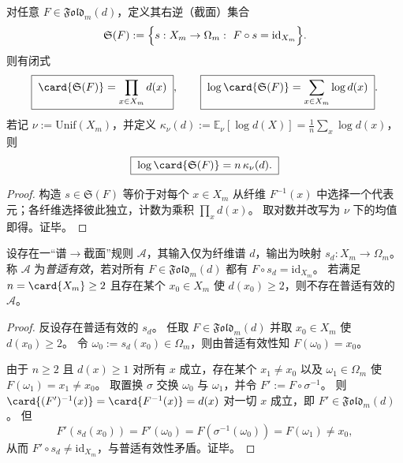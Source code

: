 \begin{theorem}\label{thm:pom-microcanonical-section-count}
对任意 \(F\in\mathfrak{Fold}_m(d)\)，定义其右逆（截面）集合
\[
\mathfrak{S}(F):=\Bigl\{s:X_m\to \Omega_m:\ F\circ s=\mathrm{id}_{X_m}\Bigr\}.
\]
则有闭式
\[
\boxed{\;
\card{\mathfrak{S}(F)}=\prod_{x\in X_m} d(x)\; } ,
\qquad
\boxed{\;
\log\card{\mathfrak{S}(F)}=\sum_{x\in X_m}\log d(x)\; } .
\]
若记 \(\nu:=\mathrm{Unif}(X_m)\)，并定义
\(
\kappa_\nu(d):=\mathbb{E}_{\nu}[\log d(X)]=\frac{1}{n}\sum_x\log d(x)
\)，则
\[
\boxed{\;
\log\card{\mathfrak{S}(F)}=n\,\kappa_\nu(d).\;}
\]
\end{theorem}
\begin{proof}
构造 \(s\in\mathfrak{S}(F)\) 等价于对每个 \(x\in X_m\) 从纤维 \(F^{-1}(x)\) 中选择一个代表元；各纤维选择彼此独立，计数为乘积 \(\prod_x d(x)\)。
取对数并改写为 \(\nu\) 下的均值即得。证毕。
\end{proof}

\begin{theorem}\label{thm:pom-spectrum-cannot-induce-universal-section}
设存在一“谱\(\to\)截面”规则 \(\mathcal{A}\)，其输入仅为纤维谱 \(d\)，输出为映射 \(s_d:X_m\to\Omega_m\)。
称 \(\mathcal{A}\) 为\emph{普适有效}，若对所有 \(F\in\mathfrak{Fold}_m(d)\) 都有 \(F\circ s_d=\mathrm{id}_{X_m}\)。
若满足 \(n=\card{X_m}\ge 2\) 且存在某个 \(x_0\in X_m\) 使 \(d(x_0)\ge 2\)，则不存在普适有效的 \(\mathcal{A}\)。
\end{theorem}
\begin{proof}
反设存在普适有效的 \(s_d\)。
任取 \(F\in\mathfrak{Fold}_m(d)\) 并取 \(x_0\in X_m\) 使 \(d(x_0)\ge 2\)。
令 \(\omega_0:=s_d(x_0)\in\Omega_m\)，则由普适有效性知 \(F(\omega_0)=x_0\)。
\par
由于 \(n\ge 2\) 且 \(d(x)\ge 1\) 对所有 \(x\) 成立，存在某个 \(x_1\neq x_0\) 以及 \(\omega_1\in\Omega_m\) 使 \(F(\omega_1)=x_1\neq x_0\)。
取置换 \(\sigma\) 交换 \(\omega_0\) 与 \(\omega_1\)，并令 \(F':=F\circ\sigma^{-1}\)。
则 \(\card{(F')^{-1}(x)}=\card{F^{-1}(x)}=d(x)\) 对一切 \(x\) 成立，即 \(F'\in\mathfrak{Fold}_m(d)\)。
但
\[
F'(s_d(x_0))=F'(\omega_0)=F(\sigma^{-1}(\omega_0))=F(\omega_1)\neq x_0,
\]
从而 \(F'\circ s_d\neq \mathrm{id}_{X_m}\)，与普适有效性矛盾。证毕。
\end{proof}

